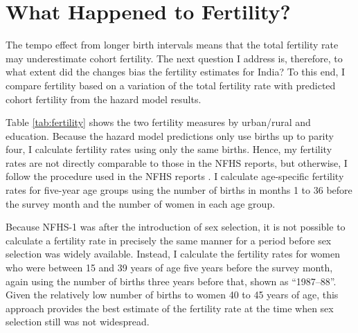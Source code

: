 \documentclass[12pt,letterpaper]{article}
\begin{document}
\section{What Happened to Fertility?\label{sec:fertility}}

The tempo effect from longer birth intervals means that the total fertility rate may 
underestimate cohort fertility. 
The next question I address is, therefore, to what extent did the changes bias the 
fertility estimates for India? 
To this end, I compare fertility based on a variation of the total fertility rate with 
predicted cohort fertility from the hazard model results.



Table \ref{tab:fertility} shows the two fertility measures by urban/rural and education.
Because the hazard model predictions only use births up to parity four, I calculate
fertility rates using only the same births.
Hence, my fertility rates are not directly comparable to those in the NFHS reports,
but otherwise, I follow the procedure used in the NFHS reports \citep{Croft2018}.
I calculate age-specific fertility rates for five-year age groups using the number of 
births in months 1 to 36 before the survey month and the number of women in each age 
group.

%

Because NFHS-1 was after the introduction of sex selection, it is not possible 
to calculate a fertility rate in precisely the same manner for a period 
before sex selection was widely available.
Instead, I calculate the fertility rates for women who were between 15 and 39 years of
age five years before the survey month, again using the number of births three years 
before that, shown as ``1987--88''.
Given the relatively low number of births to women 40 to 45 years of age, this approach 
provides the best estimate of the fertility rate at the time when sex selection still was 
not widespread.
\end{document}
